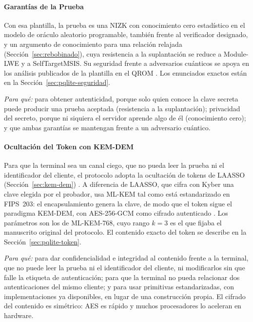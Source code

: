 \paragraph{Garantías de la Prueba}
Con esa plantilla, la prueba es una NIZK con conocimiento cero estadístico en el modelo de oráculo aleatorio programable, también frente al verificador designado, y un argumento de conocimiento para una relación relajada (Sección~\ref{sec:rebobinado}), cuya resistencia a la suplantación se reduce a Module-LWE y a SelfTargetMSIS. Su seguridad frente a adversarios cuánticos se apoya en los análisis publicados de la plantilla en el QROM \cite{liu2019revisiting, kiltz2018concrete, devevey2023detailed, barbosa2023fixing}. Los enunciados exactos están en la Sección~\ref{sec:pqlite-seguridad}.

\textit{Para qué:} para obtener autenticidad, porque solo quien conoce la clave secreta puede producir una prueba aceptada (resistencia a la suplantación); privacidad del secreto, porque ni siquiera el servidor aprende algo de él (conocimiento cero); y que ambas garantías se mantengan frente a un adversario cuántico.

\paragraph{Ocultación del Token con KEM-DEM}
Para que la terminal sea un canal ciego, que no pueda leer la prueba ni el identificador del cliente, el protocolo adopta la ocultación de tokens de LAASSO (Sección~\ref{sec:kem-dem}) \cite{ma2026laasso}. A diferencia de LAASSO, que cifra con Kyber una clave elegida por el probador, usa ML-KEM tal como está estandarizado en FIPS~203: el encapsulamiento genera la clave, de modo que el token sigue el paradigma KEM-DEM, con AES-256-GCM como cifrado autenticado \cite{nist2024fips203, cramer2003design}. Los parámetros son los de ML-KEM-768, cuyo rango $k = 3$ es el que fijaba el manuscrito original del protocolo. El contenido exacto del token se describe en la Sección~\ref{sec:pqlite-token}.

\textit{Para qué:} para dar confidencialidad e integridad al contenido frente a la terminal, que no puede leer la prueba ni el identificador del cliente, ni modificarlos sin que falle la etiqueta de autenticación; para que la terminal no pueda relacionar dos autenticaciones del mismo cliente; y para usar primitivas estandarizadas, con implementaciones ya disponibles, en lugar de una construcción propia. El cifrado del contenido es simétrico: AES es rápido y muchos procesadores lo aceleran en hardware.

